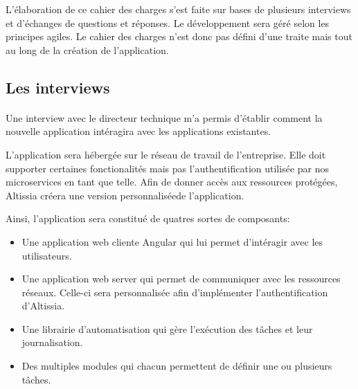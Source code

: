L'élaboration de ce cahier des charges s'est faite sur bases de plusieurs interviews et d'échanges de questions et réponses.
Le développement sera géré selon les principes agiles\footnotemark.
Le cahier des charges n'est donc pas défini d'une traite mais tout au long de la création de l'application.

\subsection{Les interviews}
\label{subsec:interviews}

    \paragraph{}
    Une interview avec le directeur technique m'a permis d'établir comment la nouvelle application intéragira avec les applications existantes.

    L'application sera hébergée sur le réseau de travail de l'entreprise.
    Elle doit supporter certaines fonctionalités mais pas l'authentification utilisée par nos microservices en tant que telle.
    Afin de donner accès aux ressources protégées, Altissia créera une version personnalisée\footnotemark de l'application.

    Ainsi, l'application sera constitué de quatres sortes de composants:
    \begin{itemize}
        \item Une application web cliente Angular qui lui permet d'intéragir avec les utilisateurs.
        \item Une application web server qui permet de communiquer avec les ressources réseaux.
        Celle-ci sera personnalisée afin d'implémenter l'authentification d'Altissia.
        \item Une librairie d'automatisation qui gère l'exécution des tâches et leur journalisation.
        \item Des multiples modules qui chacun permettent de définir une ou plusieurs tâches.
    \end{itemize}

